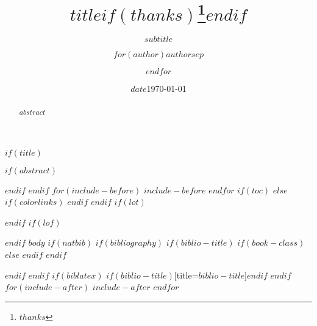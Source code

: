 \documentclass[$if(fontsize)$$fontsize$,$endif$$if(lang)$$babel-lang$,$endif$$if(papersize)$$papersize$paper,$endif$$for(classoption)$$classoption$$sep$,$endfor$]{$documentclass$}
\title{$title$$if(thanks)$\thanks{$thanks$}$endif$}
\subtitle{$subtitle$}
\author{$for(author)$$author$$sep$ \and $endfor$}
\institute{$institute$}
\date{$date$}
\date{\today}
\begin{document}
$if(title)$
\maketitle
$if(abstract)$
\begin{abstract}
$abstract$
\end{abstract}
$endif$
$endif$
$for(include-before)$
$include-before$
$endfor$
$if(toc)$
$else$
{
$if(colorlinks)$
\hypersetup{linkcolor=$if(toccolor)$$toccolor$$else$$endif$}
$endif$
\setcounter{tocdepth}{$toc-depth$}
\tableofcontents
}
$endif$
$if(lot)$
\listoftables
$endif$
$if(lof)$
\listoffigures
$endif$
$body$
$if(natbib)$
$if(bibliography)$
$if(biblio-title)$
$if(book-class)$
\renewcommand\bibname{$biblio-title$}
$else$
\renewcommand\refname{$biblio-title$}
$endif$
$endif$

$endif$
$endif$
$if(biblatex)$
\printbibliography$if(biblio-title)$[title=$biblio-title$]$endif$
$endif$
$for(include-after)$
$include-after$
$endfor$
\end{document}
